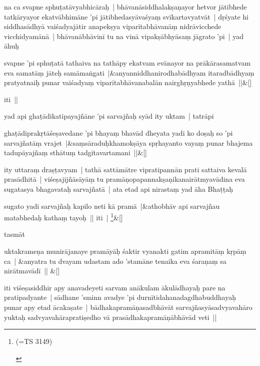 \documentclass[article,a4paper]{memoir}
\begin{document}
	  \pstart na ca svapne sphuṭatā\-vyabhicā\-raḥ | bhā\-vanā\-siddhalakṣaṇayor hetvor jā\-tibhede tatkā\-ryayor ekatvā\-bhimā\-ne 'pi jā\-tibhedasyā\-vaśyaṃ svī\-kartavyatvā\-t | dṛśyate hi siddhasā\-dhyā\- vaiśadyajā\-tir anapekṣya viparī\-tabhā\-vanā\-ṃ nidrā\-vicchede vicchidyamā\-nā\- | bhā\-vanā\-bhā\-vinī\- tu na vinā\- vipakṣā\-bhyā\-saṃ jā\-grato 'pi | yad ā\-huḥ 
	\pend
      
	    
	    \stanza[\smallbreak]
svapne 'pi sphuṭatā\- tathaiva na tathā\-py ekatvam evā\-nayor na prā\-kā\-rasamatvam eva samatā\-ṃ jā\-teḥ samā\-maṅgati |&anyanniddhanirodhabā\-dhyam itaradbā\-dhyaṃ pratyatnaiḥ punar vaiśadyaṃ viparī\-tabhā\-vanabalā\-n nairghṛṇyabhede yathā\- ||\&[\smallbreak]


	

	  \pstart iti ||
	\pend
      

	  \pstart yad api ghaṭā\-dikatipayajñā\-ne 'pi sarvajñaḥ syā\-d ity uktam | tatrā\-pi 
	\pend
      
	    
	    \stanza[\smallbreak]
ghaṭā\-diprakṛtā\-śeṣavedane 'pi bhayaṃ bhavā\-d dheyata yadi ko doṣaḥ so 'pi sarvajñatā\-ṃ vrajet |&saṃsā\-raduḥkhamokṣā\-ya spṛhayanto vayaṃ punar bhajema tadupā\-yajñaṃ sthā\-tuṃ tadgī\-tavartamani ||\&[\smallbreak]


	

	  \pstart ity uttaraṃ draṣṭavyam | tathā\- sattā\-mā\-tre vipratipannā\-n prati sattaiva kevalā\- prasā\-dhitā\- | viśeṣajijñā\-sā\-yā\-ṃ tu pramā\-ṇopapannakṣaṇikanairā\-tmyavā\-dina eva sugatasya bhagavataḥ sarvajñatā\- | ata etad api nirastaṃ yad ā\-ha Bhaṭṭaḥ 
	\pend
      
	    
	    \stanza[\smallbreak]
sugato yadi sarvajñaḥ kapilo neti kā\- pramā\- |&athobhā\-v api sarvajñau matabhedaḥ kathaṃ tayoḥ || iti | \footnote{\begin{english}(=TS 3149)\end{english}}\&[\smallbreak]


	

	  \pstart tasmā\-t 
	\pend
      
	    
	    \stanza[\smallbreak]
uktakrameṇa munirā\-janaye pramā\-yā\-ḥ śaktir vyanakti gatim apramitā\-ṃ kṛpā\-ṃ ca | &anyatra tu dvayam udastam ado 'stamā\-ne tenaika eva śaraṇaṃ sa nirā\-tmavā\-dī\- || \&[\smallbreak]


	

	  \pstart iti viśeṣasiddhir apy anavadeyeti sarvam anā\-kulam ā\-kulā\-dhayaḥ pare na pratipadyante | sā\-dhane 'sminn avadye 'pi durnī\-tidahanadagdhabuddhayaḥ punar apy etad ā\-cakaṣate | bā\-dhakapramā\-ṇasadbhā\-vā\-t sarvajñasyā\-sadvyavahā\-ro yuktaḥ sadvyavahā\-rapratiṣedho vā\- prasā\-dhakapramā\-ṇā\-bhā\-vā\-d veti || 
	\pend
      
\end{document}
